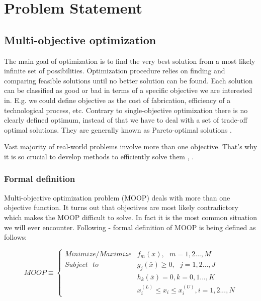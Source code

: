 \chapter{Problem Statement}
\label{cha:multiObjectiveOptimization}




\section{Multi-objective optimization}
\label{sec:multi}

The main goal of optimization is to find the very best solution from a most likely infinite set of possibilities.
Optimization procedure relies on finding and comparing feasible solutions until no better solution can be found.
Each solution can be classified as good or bad in terms of a specific objective we are interested in.
E.g. we could define objective as the cost of fabrication, efficiency of a technological process, etc.
Contrary to single-objective optimization there is no clearly defined optimum, instead of that we have to deal with a set of trade-off optimal solutions.
They are generally known as Pareto-optimal solutions \cite{Phd}.

Vast majority of real-world problems involve more than one objective.
That's why it is so crucial to develop methods to efficiently solve them 
\cite{Phd}, \cite{Deb:2001:MOU:559152}.

\subsection{Formal definition}

Multi-objective optimization problem (MOOP) deals with more than one objective function.
It turns out that objectives are most likely contradictory which makes the MOOP difficult to solve.
In fact it is the most common situation we will ever encounter. 
Following \cite{Deb:2001:MOU:559152} - formal definition of MOOP is being defined as follows:

\begin{equation} 
MOOP \equiv
 \begin{cases}
     Minimize/Maximize  & f_{m}(\bar{x}), \text{ } m = 1,2...,M \\
     Subject \text{ } to  &  g_{j}(\bar{x}) \geq 0, \text{ } j = 1,2..., J  \\ 
			  &  h_{k}(\bar{x}) = 0, k = 0,1...,K \\
			  &  x_{i}^{(L)} \leq x_{i} \leq x_{i}^{(U)}, i = 1,2...,N
      
\end{cases}  
\end{equation}

